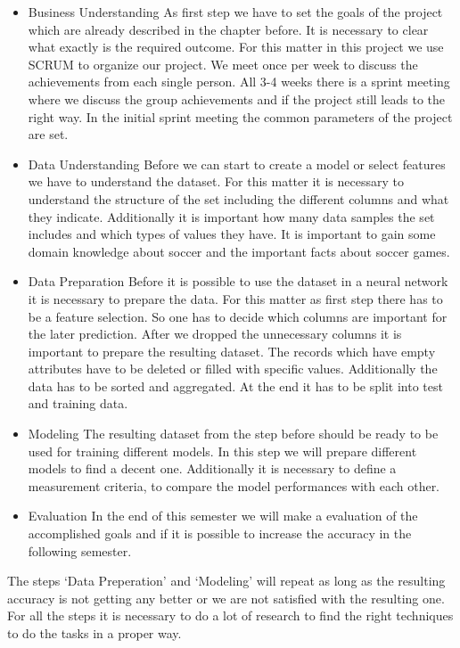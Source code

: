 \begin{itemize}
\item Business Understanding \newline
As first step we have to set the goals of the project which are already described in the chapter before. It is necessary to clear what exactly is the required outcome. For this matter in this project we use SCRUM to organize our project. We meet once per week to discuss the achievements from each single person. All 3-4 weeks there is a sprint meeting where we discuss the group achievements and if the project still leads to the right way. In the initial sprint meeting the common parameters of the project are set. 
\item Data Understanding \newline
Before we can start to create a model or select features we have to understand the dataset. For this matter it is necessary to understand the structure of the set including the different columns and what they indicate. Additionally it is important how many data samples the set includes and which types of values they have. It is important to gain some domain knowledge about soccer and the important facts about soccer games.
\item Data Preparation \newline
 Before it is possible to use the dataset in a neural network it is necessary to prepare the data. For this matter as first step there has to be a feature selection. So one has to decide which columns are important for the later prediction. After we dropped the unnecessary columns it is important to prepare the resulting dataset. The records which have empty attributes have to be deleted or filled with specific values. Additionally the data has to be sorted and aggregated. At the end it has to be split into test and training data. 
 \item Modeling \newline
 The resulting dataset from the step before should be ready to be used for training different models. In this step we will prepare different models to find a decent one. Additionally it is necessary to define a measurement criteria, to compare the model performances with each other.   
\item Evaluation \newline
In the end of this semester we will make a evaluation of the accomplished goals and if it is possible to increase the accuracy in the following semester.  
\end{itemize}

The steps `Data Preperation' and `Modeling' will repeat as long as the resulting accuracy is not getting any better or we are not satisfied with the resulting one. For all the steps it is necessary to do a lot of research to find the right techniques to do the tasks in a proper way. 